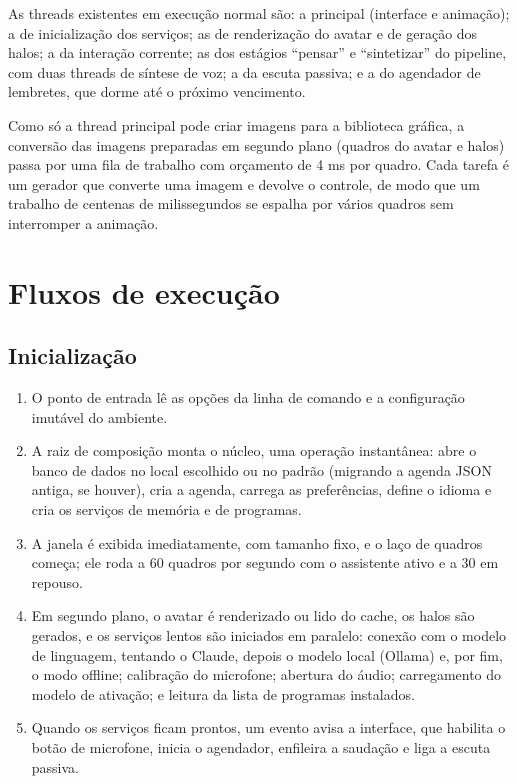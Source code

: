 As threads existentes em execução normal são: a principal (interface e animação); a de inicialização
dos serviços; as de renderização do avatar e de geração dos halos; a da interação corrente; as dos
estágios “pensar” e “sintetizar” do pipeline, com duas threads de síntese de voz; a da escuta passiva;
e a do agendador de lembretes, que dorme até o próximo vencimento.

Como só a thread principal pode criar imagens para a biblioteca gráfica, a conversão das imagens
preparadas em segundo plano (quadros do avatar e halos) passa por uma fila de trabalho com orçamento de
4 ms por quadro. Cada tarefa é um gerador que converte uma imagem e devolve o controle, de modo que um
trabalho de centenas de milissegundos se espalha por vários quadros sem interromper a animação.

\section{Fluxos de execução}

\subsection{Inicialização}

\begin{enumerate}[label=\arabic*.]
  \item O ponto de entrada lê as opções da linha de comando e a configuração imutável do ambiente.
  \item A raiz de composição monta o núcleo, uma operação instantânea: abre o banco de dados no local
        escolhido ou no padrão (migrando a agenda JSON antiga, se houver), cria a agenda, carrega as preferências, define o idioma e cria
        os serviços de memória e de programas.
  \item A janela é exibida imediatamente, com tamanho fixo, e o laço de quadros começa; ele roda a 60
        quadros por segundo com o assistente ativo e a 30 em repouso.
  \item Em segundo plano, o avatar é renderizado ou lido do cache, os halos são gerados, e os serviços
        lentos são iniciados
        em paralelo: conexão com o modelo de linguagem, tentando o Claude, depois o modelo local
        (Ollama) e, por fim, o modo offline;
        calibração do microfone; abertura do áudio; carregamento do modelo de ativação; e leitura da
        lista de programas instalados.
  \item Quando os serviços ficam prontos, um evento avisa a interface, que habilita o botão de
        microfone, inicia o agendador, enfileira a saudação e liga a escuta passiva.
\end{enumerate}

